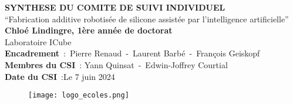 \documentclass[11pt,a4paper]{article}
\begin{document}
\pagestyle{empty}

\newcommand\titleofdoc{\bfseries SYNTHESE DU COMITE DE SUIVI INDIVIDUEL}
        
    \begin{titlepage}

       \begin{center}
            \vspace*{1.5cm} %
            \Huge{\titleofdoc} \\
            \vspace{4cm}
            \Huge{``Fabrication additive robotisée de silicone assistée par l'intelligence artificielle''}\\
            \vspace{0.8 cm}
            \LARGE{\textbf{Chloé Lindingre, 1ère année de doctorat}}\\
            
            \vspace{0.5 cm}
            \LARGE{Laboratoire ICube} \\
            \vspace{5.5 cm}
            \Large{\textbf{Encadrement}~:~Pierre Renaud~-~Laurent Barbé~-~François Geiskopf} \\
            \vspace{0.5 cm}
            \Large{\textbf{Membres du CSI}~: Yann Quinsat~-~Edwin-Joffrey Courtial} \\
            
                        \vspace{0.5 cm}
            \Large{\textbf{Date du CSI}~:}Le 7 juin 2024
            \begin{figure}[b]
                \centering
                \texttt{[image: logo\_ecoles.png]}
            \end{figure}
        \end{center}
    \setcounter{page}{0}
    \end{titlepage}
\restoregeometry\newpage
\setcounter{page}{1}
\pagestyle{plain}


\end{document}
